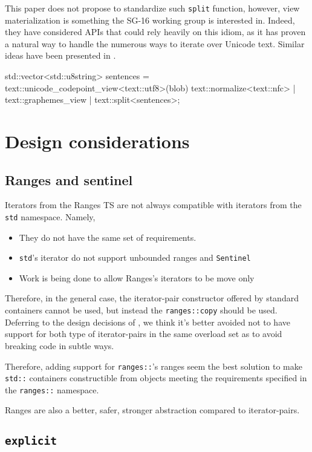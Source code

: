 \documentclass{wg21}
\newcommand{\cc}[1]{\texttt{#1}}
\begin{document}
This paper does not propose to standardize such \cc{split} function, however, view materialization is something the SG-16 working group is interested in.
Indeed, they have considered APIs that could rely heavily on this idiom, as it has proven a natural way to handle the numerous ways to iterate over Unicode text.
Similar ideas have been presented in \cite{P1004}.

\begin{codeblock}
    std::vector<std::u8string> sentences =
        text::unicode_codepoint_view<text::utf8>(blob)
        text::normalize<text::nfc> |
        text::graphemes_view |
        text::split<sentences>;
\end{codeblock}

\section{Design considerations}


\subsection{Ranges and sentinel}

Iterators from the Ranges TS are not always compatible with iterators from the \cc{std} namespace.
Namely,
\begin{itemize}
    \item They do not have the same set of requirements.
    \item \cc{std}'s iterator do not support unbounded ranges and \cc{Sentinel}
    \item Work is being done to allow Ranges's iterators to be move only
\end{itemize}

Therefore, in the general case, the iterator-pair constructor offered by standard containers cannot be used, but instead the \cc{ranges::copy} should be used.
Deferring to the design decisions of \cite{P0896R3}, we think it's better avoided not to have support for both type of iterator-pairs in the same overload set
as to avoid breaking code in subtle ways.

Therefore, adding support for \cc{ranges::}'s ranges seem the best solution to make \cc{std::} containers constructible from objects meeting the requirements
specified in the \cc{ranges::} namespace.

Ranges are also a better, safer, stronger abstraction compared to iterator-pairs.

\subsection{\cc{explicit}}
\end{document}
